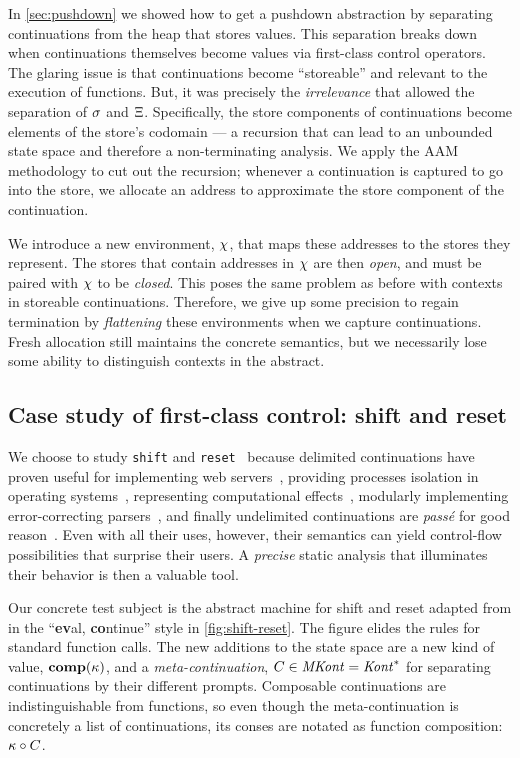 In \autoref{sec:pushdown} we showed how to get a pushdown abstraction by separating continuations from the heap that stores values.
%
This separation breaks down when continuations themselves become values via first-class control operators.
%
The glaring issue is that continuations become ``storeable'' and relevant to the execution of functions.
%
But, it was precisely the \emph{irrelevance} that allowed the separation of $\sigma$ and $\Xi$.
%
Specifically, the store components of continuations become elements of the store's codomain --- a recursion that can lead to an unbounded state space and therefore a non-terminating analysis.
%
We apply the AAM methodology to cut out the recursion; whenever a continuation is captured to go into the store, we allocate an address to approximate the store component of the continuation.

We introduce a new environment, $\chi$, that maps these addresses to the stores they represent.
%
The stores that contain addresses in $\chi$ are then \emph{open}, and must be paired with $\chi$ to be \emph{closed}.
%
This poses the same problem as before with contexts in storeable continuations.
%
Therefore, we give up some precision to regain termination by \emph{flattening} these environments when we capture continuations.
%
Fresh allocation still maintains the concrete semantics, but we necessarily lose some ability to distinguish contexts in the abstract.

\subsection{Case study of first-class control: shift and reset}
We choose to study {\tt shift} and {\tt reset}~\citep{ianjohnson:danvy:filinski:delim:1990} because delimited continuations have proven useful for implementing web servers~\citep{dvanhorn:Queinnec2004Continuations,jay-communication}, providing processes isolation in operating systems~\citep{dvanhorn:Kiselyov2007Delimited}, representing computational effects~\citep{dvanhorn:Filinski1994Representing}, modularly implementing error-correcting parsers~\citep{dvanhorn:Shivers2011Modular}, and finally undelimited continuations are \emph{pass\'e} for good reason~\citep{ianjohnson:kiselyov:against-callcc}.
%
Even with all their uses, however, their semantics can yield control-flow possibilities that surprise their users.
%
A \emph{precise} static analysis that illuminates their behavior is then a valuable tool.
%

Our concrete test subject is the abstract machine for shift and reset adapted from \citet{ianjohnson:Biernacki2006274} in the ``{\bf ev}al, {\bf co}ntinue'' style in \autoref{fig:shift-reset}.
%
The figure elides the rules for standard function calls.
%
The new additions to the state space are a new kind of value, $\mathbf{comp}(\kappa)$, and a \emph{meta-continuation}, $C \in \mathit{MKont} = \mathit{Kont}^*$ for separating continuations by their different prompts.
%
Composable continuations are indistinguishable from functions, so even though the meta-continuation is concretely a list of continuations, its conses are notated as function composition: $\kappa\circ C$.

